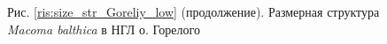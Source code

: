 \documentclass[12pt, a4paper]{article}
\begin{document}
\begin{figure}[h]


\begin{center}
Рис. \ref{ris:size_str_Goreliy_low} (продолжение). Размерная структура {\it Macoma balthica} в НГЛ о. Горелого

\end{center}
\end{figure}
\end{document}
